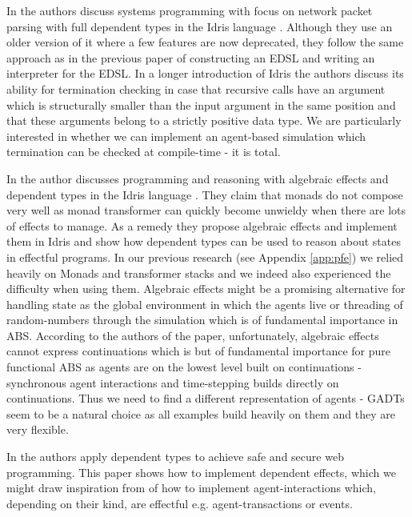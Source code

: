 In \cite{brady_idris_2011} the authors discuss systems programming with focus on network packet parsing with full dependent types in the Idris language \cite{brady_idris_2013}. Although they use an older version of it where a few features are now deprecated, they follow the same approach as in the previous paper of constructing an EDSL and writing an interpreter for the EDSL. In a longer introduction of Idris the authors discuss its ability for termination checking in case that recursive calls have an argument which is structurally smaller than the input argument in the same position and that these arguments belong to a strictly positive data type. We are particularly interested in whether we can implement an agent-based simulation which termination can be checked at compile-time - it is total.

In \cite{brady_programming_2013} the author discusses programming and reasoning with algebraic effects and dependent types in the Idris language \cite{brady_idris_2013}. They claim that monads do not compose very well as monad transformer can quickly become unwieldy when there are lots of effects to manage. As a remedy they propose algebraic effects \cite{bauer_programming_2015} and implement them in Idris and show how dependent types can be used to reason about states in effectful programs. In our previous research (see Appendix \ref{app:pfe}) we relied heavily on Monads and transformer stacks and we indeed also experienced the difficulty when using them. Algebraic effects might be a promising alternative for handling state as the global environment in which the agents live or threading of random-numbers through the simulation which is of fundamental importance in ABS. According to the authors of the paper, unfortunately, algebraic effects cannot express continuations which is but of fundamental importance for pure functional ABS as agents are on the lowest level built on continuations - synchronous agent interactions and time-stepping builds directly on continuations. Thus we need to find a different representation of agents - GADTs seem to be a natural choice as all examples build heavily on them and they are very flexible.

In \cite{fowler_dependent_2014} the authors apply dependent types to achieve safe and secure web programming. This paper shows how to implement dependent effects, which we might draw inspiration from of how to implement agent-interactions which, depending on their kind, are effectful e.g. agent-transactions or events.


